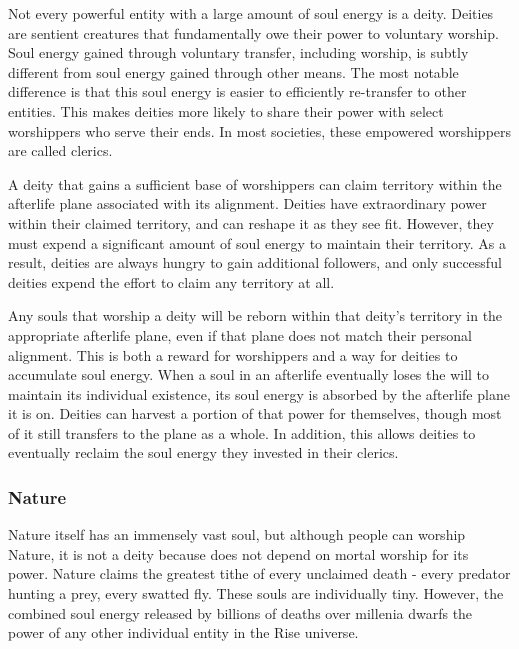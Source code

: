             Not every powerful entity with a large amount of soul energy is a deity.
            Deities are sentient creatures that fundamentally owe their power to voluntary worship.
            Soul energy gained through voluntary transfer, including worship, is subtly different from soul energy gained through other means.
            The most notable difference is that this soul energy is easier to efficiently re-transfer to other entities.
            This makes deities more likely to share their power with select worshippers who serve their ends.
            In most societies, these empowered worshippers are called clerics.

            A deity that gains a sufficient base of worshippers can claim territory within the afterlife plane associated with its alignment.
            Deities have extraordinary power within their claimed territory, and can reshape it as they see fit.
            However, they must expend a significant amount of soul energy to maintain their territory.
            As a result, deities are always hungry to gain additional followers, and only successful deities expend the effort to claim any territory at all.

            Any souls that worship a deity will be reborn within that deity's territory in the appropriate afterlife plane, even if that plane does not match their personal alignment.
            This is both a reward for worshippers and a way for deities to accumulate soul energy.
            When a soul in an afterlife eventually loses the will to maintain its individual existence, its soul energy is absorbed by the afterlife plane it is on.
            Deities can harvest a portion of that power for themselves, though most of it still transfers to the plane as a whole.
            In addition, this allows deities to eventually reclaim the soul energy they invested in their clerics.

        \subsubsection{Nature}
            Nature itself has an immensely vast soul, but although people can worship Nature, it is not a deity because does not depend on mortal worship for its power.
            Nature claims the greatest tithe of every unclaimed death - every predator hunting a prey, every swatted fly.
            These souls are individually tiny.
            However, the combined soul energy released by billions of deaths over millenia dwarfs the power of any other individual entity in the Rise universe.

